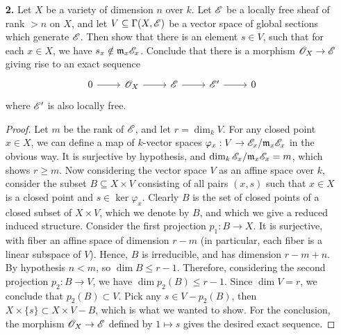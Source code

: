 \documentclass{article}
\begin{document}
\begin{enumerate} [label=\textbf{\arabic*.}, leftmargin=0em]
\item[\textbf{2.}] Let $X$ be a variety of dimension $n$ over $k$. Let $\mathscr{E}$ be a locally free sheaf of rank $> n$ on $X$, and let $V \subseteq \Gamma(X, \mathscr{E})$ be a vector space of global sections which generate $\mathscr{E}$. Then show that there is an element $s \in V$, such that for each $x \in X$, we have $s_x \notin \mathfrak{m}_x \mathscr{E}_x$. Conclude that there is a morphism $\mathscr{O}_X \to \mathscr{E}$ giving rise to an exact sequence
\[ \begin{tikzcd}
    0 \arrow[r] & \fO_X \arrow[r] & \fE \arrow[r] & \fE' \arrow[r] & 0
    \end{tikzcd} \]
where $\mathscr{E}'$ is also locally free.

\begin{proof}
Let $m$ be the rank of $\mathscr{E}$, and let $r = \dim_k{V}$.
For any closed point $x \in X$, we can define a map of $k$-vector spaces $\varphi_x : V \to \mathscr{E}_x / \mathfrak{m}_x \mathscr{E}_x$ in the obvious way.
It is surjective by hypothesis, and $\dim_k \mathscr{E}_x / \mathfrak{m}_x \mathscr{E}_x = m$, which shows $r \geq m$.
Now considering the vector space $V$ as an affine space over $k$, consider the subset $B \subseteq X \times V$ consisting of all pairs $(x, s)$ such that $x \in X$ is a closed point and $s \in \ker{\varphi_x}$.
Clearly $B$ is the set of closed points of a closed subset of $X \times V$, which we denote by $B$, and which we give a reduced induced structure.
Consider the first projection $p_1 : B \to X$.
It is surjective, with fiber an affine space of dimension $r - m$ (in particular, each fiber is a linear subspace of $V$).
Hence, $B$ is irreducible, and has dimension $r - m + n$. By hypothesis $n < m$, so $\dim{B} \leq r - 1$.
Therefore, considering the second projection $p_2 : B \to V$, we have $\dim p_2(B) \leq r - 1$.
Since $\dim{V} = r$, we conclude that $p_2(B) \subset V$.
Pick any $s \in V - p_2(B)$, then $X \times \{s\} \subset X \times V - B$, which is what we wanted to show.
For the conclusion, the morphism $\mathscr{O}_X \to \mathscr{E}$ defined by $1 \mapsto s$ gives the desired exact sequence.
\end{proof}


\end{enumerate}
\end{document}
